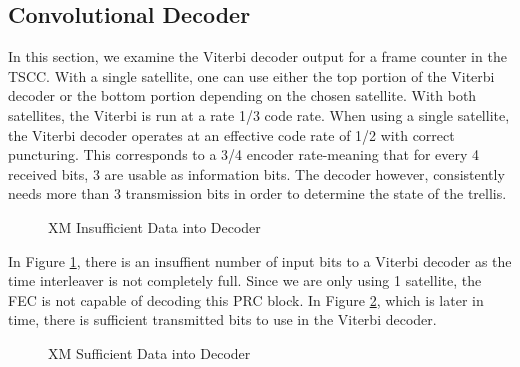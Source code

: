\documentclass[conference,onecolumn]{IEEEtran}
\begin{document}


\subsection{Convolutional Decoder}

In this section, we examine the Viterbi decoder output for a frame counter in the TSCC. With a single satellite, one can use either the top portion of the Viterbi decoder or the bottom portion depending on the chosen satellite.  With both satellites, the Viterbi is run at a rate 1/3 code rate.  When using a single satellite, the Viterbi decoder operates at an effective code rate of 1/2 with correct puncturing. This corresponds to a 3/4 encoder rate-meaning that for every 4 received bits, 3 are usable as information bits.  The decoder however, consistently needs more than 3 transmission bits in order to determine the state of the trellis.

\begin{figure}[H]
	\centerline{}
	\caption{XM Insufficient Data into Decoder}
	\label{fig::Viterbi_1}
\end{figure}

In Figure \ref{fig::Viterbi_1}, there is an insuffient number of input bits to a Viterbi decoder as the time interleaver is not completely full.  Since we are only using 1 satellite, the FEC is not capable of decoding this PRC block.  In Figure \ref{fig::Viterbi_2}, which is later in time, there is sufficient transmitted bits to use in the Viterbi decoder.

\begin{figure}[H]
	\centerline{}
	\caption{XM Sufficient Data into Decoder}
	\label{fig::Viterbi_2}
\end{figure}
\end{document}
